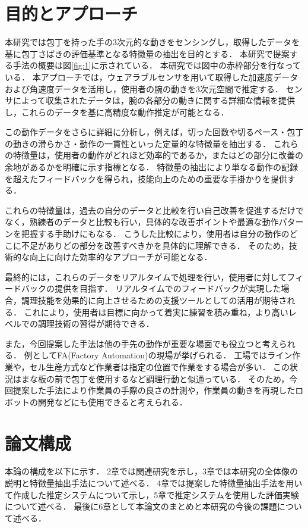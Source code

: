 \section{目的とアプローチ}
本研究では包丁を持った手の3次元的な動きをセンシングし，取得したデータを基に包丁さばきの評価基準となる特徴量の抽出を目的とする．
本研究で提案する手法の概要は図\ref{fig:1}に示されている．
本研究では図中の赤枠部分を行なっている．
本アプローチでは，ウェアラブルセンサを用いて取得した加速度データおよび角速度データを活用し，使用者の腕の動きを3次元空間で推定する．
センサによって収集されたデータは，腕の各部分の動きに関する詳細な情報を提供し，これらのデータを基に高精度な動作推定が可能となる．

この動作データをさらに詳細に分析し，例えば，切った回数や切るペース・包丁の動きの滑らかさ・動作の一貫性といった定量的な特徴量を抽出する．
これらの特徴量は，使用者の動作がどれほど効率的であるか，またはどの部分に改善の余地があるかを明確に示す指標となる．
特徴量の抽出により単なる動作の記録を超えたフィードバックを得られ，技能向上のための重要な手掛かりを提供する．

これらの特徴量は，過去の自分のデータと比較を行い自己改善を促進するだけでなく，熟練者のデータと比較も行い，具体的な改善ポイントや最適な動作パターンを把握する手助けにもなる．
こうした比較により，使用者は自分の動作のどこに不足がありどの部分を改善すべきかを具体的に理解できる．
そのため，技術的な向上に向けた効率的なアプローチが可能となる．

最終的には，これらのデータをリアルタイムで処理を行い，使用者に対してフィードバックの提供を目指す．
リアルタイムでのフィードバックが実現した場合，調理技能を効果的に向上させるための支援ツールとしての活用が期待される．
これにより，使用者は目標に向かって着実に練習を積み重ね，より高いレベルでの調理技術の習得が期待できる．

また，今回提案した手法は他の手先の動作が重要な場面でも役立つと考えられる．
例としてFA(Factory Automation)の現場が挙げられる．
工場ではライン作業や，セル生産方式など作業者は指定の位置で作業をする場合が多い．
この状況はまな板の前で包丁を使用するなど調理行動と似通っている．
そのため，今回提案した手法により作業員の手際の良さの計測や，作業員の動きを再現したロボットの開発などにも使用できると考えられる．

\section{論文構成}
本論の構成を以下に示す．
2章では関連研究を示し，3章では本研究の全体像の説明と特徴量抽出手法について述べる．
4章では提案した特徴量抽出手法を用いて作成した推定システムについて示し，5章で推定システムを使用した評価実験について述べる．
最後に6章として本論文のまとめと本研究の今後の課題について述べる．